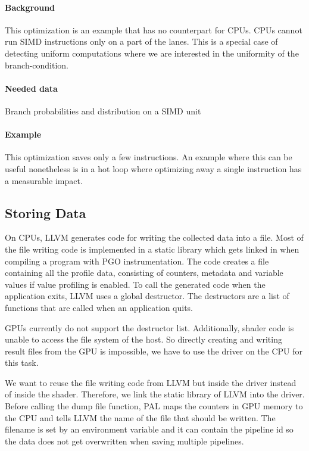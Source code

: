 \paragraph{Background} This optimization is an example that has no counterpart for CPUs.
CPUs cannot run SIMD instructions only on a part of the lanes.
This is a special case of detecting uniform computations where we are interested in the uniformity of the branch-condition.
\paragraph{Needed data} Branch probabilities and distribution on a SIMD unit
\paragraph{Example} This optimization saves only a few instructions. An example where this can be useful nonetheless is in a hot loop where optimizing away a single instruction has a measurable impact.

\subsection{Storing Data}
\label{sub:save-design}
On CPUs, LLVM generates code for writing the collected data into a file.
Most of the file writing code is implemented in a static library which gets linked in when compiling a program with PGO instrumentation.
The code creates a file containing all the profile data, consisting of counters, metadata and variable values if value profiling is enabled.
To call the generated code when the application exits, LLVM uses a global destructor.
The destructors are a list of functions that are called when an application quits.

GPUs currently do not support the destructor list. Additionally, shader code is unable to access the file system of the host.
So directly creating and writing result files from the GPU is impossible, we have to use the driver on the CPU for this task.

We want to reuse the file writing code from LLVM but inside the driver instead of inside the shader.
Therefore, we link the static library of LLVM into the driver.
Before calling the dump file function, PAL maps the counters in GPU memory to the CPU and tells LLVM the name of the file that should be written.
The filename is set by an environment variable and it can contain the pipeline id so the data does not get overwritten when saving multiple pipelines.

